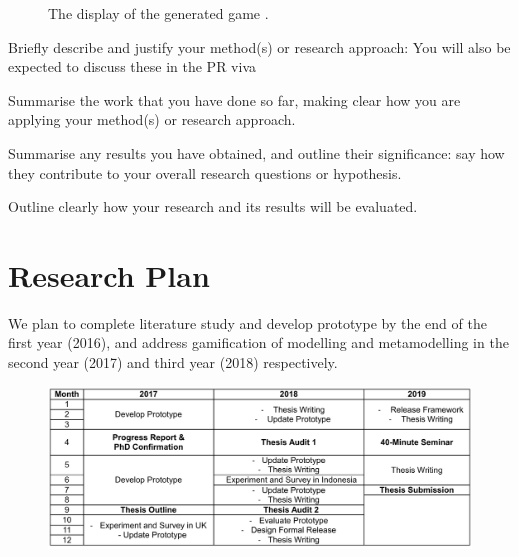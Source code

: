 \documentclass[12pt, a4paper]{report}
\begin{document}
\begin{figure}[!t]
\centering
{}
\caption{The display of the generated game \cite{Yohannis2016}.}
\label{game-annotated}
\end{figure}


Briefly describe and justify your  method(s) or research approach: You will also be expected to discuss these in the PR viva

Summarise the work that you have done so far, making clear how you are applying your method(s) or research approach.

Summarise any results you have obtained, and outline their significance: say how they contribute to your overall research questions or hypothesis.

Outline clearly how your research and its results will be evaluated.

\chapter{Research Plan}
\label{Research Plan}
We plan to complete literature study and develop prototype by the end of the first year (2016), and address gamification of modelling and metamodelling in the second year (2017) and third year (2018) respectively. 

\begin {table}[ht]
\caption {Research Timetable} 
\end{table}
\begin{figure}[ht]
\centering
\includegraphics[width=\textwidth]{timetable}
\end{figure}
\end{document}
